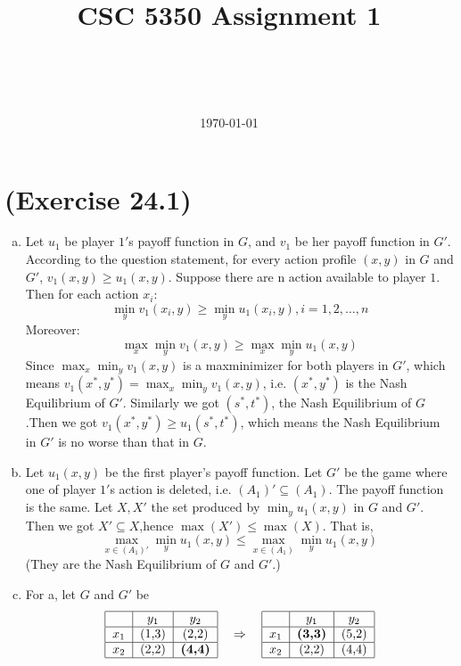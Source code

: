 \documentclass[a4paper,12pt]{article}
\title{CSC 5350 Assignment 1}
\author{\myname\\\mymail\\\CSE\\\CUHK}
\date{\today}
\newcommand{\NE}{Nash Equilibrium }
\begin{document}
\maketitle
\section{(Exercise 24.1)}
\begin{enumerate}[a.]
\item
Let $u_{1}$ be player $1'$s payoff function in $G$, and $v_{1}$ be
her payoff function in $G'$. According to the question statement,
for every action profile $(x,y)$ in $G$ and $G'$, $v_{1}(x,y)\geq
u_{1}(x,y)$. Suppose there are n action available to player $1$.
Then for each action $x_{i}$:
\begin{equation}\min_{y}v_{1}(x_{i},y)\geq \min_{y}u_{1}(x_{i},y) ,
i=1,2,\ldots,n
\end{equation}
Moreover:
\begin{equation}
\max_{x}\min_{y}v_{1}(x,y)\geq \max_{x}\min_{y}u_{1}(x,y)
\end{equation}
Since $\max_{x}\min_{y}v_{1}(x,y)$ is a maxminimizer for both
players in $G'$, which means
$v_{1}(x^*,y^*)=\max_{x}\min_{y}v_{1}(x,y)$, i.e. $(x^*,y^*)$ is the
\NE of $G'$. Similarly we got $(s^*,t^*)$, the \NE of $G$.Then we
got $v_1(x^*,y^*)\geq u_1(s^*,t^*)$, which means the Nash
Equilibrium in $G'$ is no worse than that in $G$.

\item
Let $u_1(x,y)$ be the first player's payoff function. Let $G'$ be
the game where one of player $1'$s action is deleted, i.e.
$(A_1)'\subseteq (A_1)$. The payoff function is the same. Let $X,X'$
the set produced by $\min_yu_1(x,y)$ in $G$ and $G'$. Then we got
$X'\subseteq X$,hence $\max(X')\leq \max(X)$. That is,
\begin{equation}
\max_{x\in (A_1)'}\min_yu_1(x,y)\leq \max_{x\in
(A_1)}\min_yu_1(x,y)\end{equation} (They are the \NE of $G$ and
$G'$.)

\item
For a, let $G$ and $G'$ be \\
\[
\begin{tabular}{|c|c|c|}
  \hline
        & $y_1$ & $y_2$ \\
  \hline
  $x_1$ & (1,3) & (2,2) \\
  \hline
  $x_2$ & (2,2) & \textbf{(4,4)} \\
  \hline
\end{tabular}
\quad \Rightarrow \quad
\begin{tabular}{|c|c|c|}
  \hline
        & $y_1$ & $y_2$ \\
  \hline
  $x_1$ & \textbf{(3,3)} & (5,2) \\
  \hline
  $x_2$ & (2,2) & (4,4) \\
  \hline
\end{tabular}
\]


\end{enumerate}
\end{document}
